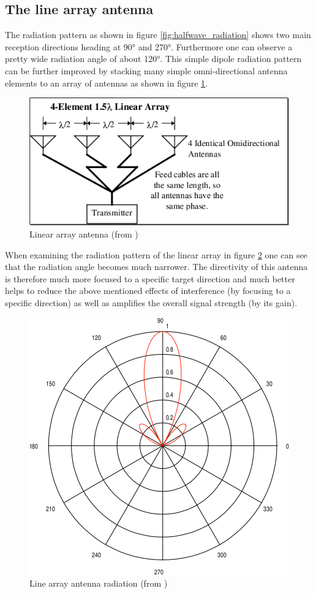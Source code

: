\clearpage
\subsection{The line array antenna}
The radiation pattern as shown in figure \ref{fig:halfwave_radiation} shows two main reception directions heading at 90° and 270°. Furthermore one can observe a pretty wide radiation angle of about 120°. This simple dipole radiation pattern can be further improved by stacking many simple omni-directional antenna elements to an array of antennas as shown in figure \ref{fig:array}.

\begin{figure}[!h]
\centering
\includegraphics[scale=0.6]{figures/array_antenna.png}\caption{\label{fig:array}Linear array antenna (from \cite{primer})}
\end{figure}

When examining the radiation pattern of the linear array in figure \ref{fig:array_radiation} one can see that the radiation angle becomes much narrower. The directivity of this antenna is therefore much more focused to a specific target direction and much better helps to reduce the above mentioned effects of interference (by focusing to a specific direction) as well as amplifies the overall signal strength (by its gain).

\begin{figure}[!h]
\centering
\includegraphics[scale=0.6]{figures/array_radiation.png}\caption{\label{fig:array_radiation}Line array antenna radiation (from \cite{primer})}
\end{figure}

